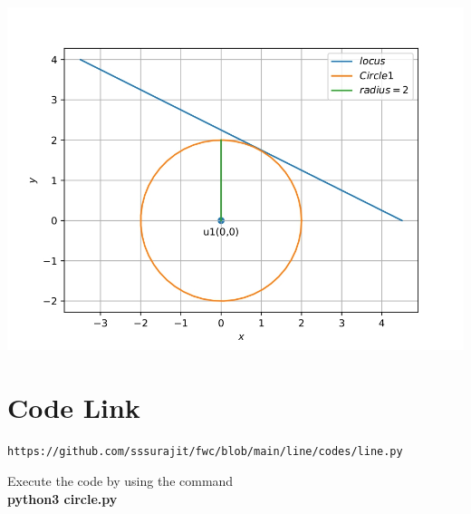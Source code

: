 \documentclass[journal,12pt,twocolumn]{IEEEtran}
\begin{document}
    \centering
    \includegraphics[width=\columnwidth]{fig.jpg}
    \label{fig:my_label}
    
\section{\textbf{Code Link}}

\begin{lstlisting}
https://github.com/sssurajit/fwc/blob/main/line/codes/line.py
\end{lstlisting}
Execute the code by using the command
\\ \textbf{python3 circle.py}
    
\end{document}
